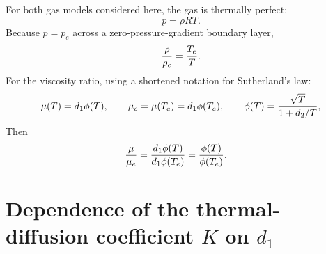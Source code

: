 For both gas models considered here, the gas is thermally perfect:
\begin{equation}
  p=\rho R T.
  \label{app:ma:eq:thermally_perfect}
\end{equation}
Because \(p=p_e\) across a zero-pressure-gradient boundary layer,
\begin{equation}
  \frac{\rho}{\rho_e}
  =
  \frac{T_e}{T}.
  \label{app:ma:eq:densityratio}
\end{equation}
For the viscosity ratio, using a shortened notation for Sutherland's law:
\begin{equation}
  \mu(T)=d_1\phi(T), \qquad
  \mu_e=\mu(T_e)=d_1\phi(T_e),\qquad
  \phi(T)=\frac{\sqrt{T}}{1+d_2/T},
  \label{app:ma:eq:defs}
\end{equation}
Then
\begin{align}
  \frac{\mu}{\mu_e}
  &=
  \frac{d_1\phi(T)}{d_1\phi(T_e)}
   =
  \frac{\phi(T)}{\phi(T_e)}.
  \label{app:ma:eq:muratio}
\end{align}

\section{Dependence of the thermal-diffusion coefficient \texorpdfstring{\(K\)}{K} on \texorpdfstring{\(d_1\)}{d1}}
\label{app:ma:sec:K_dependence}

